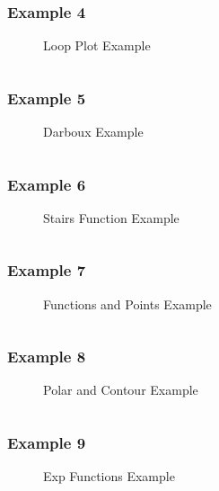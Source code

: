 \subsubsection{Example 4}
\begin{figure}[!htb]
    \centering
    
    \caption{Loop Plot Example}
    \label{fig:4-loop-to-plot-function}
\end{figure}
\inputminted{latex}{./gallery/example_4.tex}
\newpage

\subsubsection{Example 5}
\begin{figure}[!htb]
    \centering
    
    \caption{Darboux Example}
    \label{fig:5-darboux-function}
\end{figure}
\inputminted{latex}{./gallery/example_5.tex}
\newpage


\subsubsection{Example 6}
\begin{figure}[!htb]
    \centering
    
    \caption{Stairs Function Example}
    \label{fig:6-stairs-function}
\end{figure}
\inputminted{latex}{./gallery/example_6.tex}
\newpage


\subsubsection{Example 7}
\begin{figure}[!htb]
    \centering
    
    \caption{Functions and Points Example}
    \label{fig:7-points-function}
\end{figure}
\inputminted{latex}{./gallery/example_7.tex}
\newpage


\subsubsection{Example 8}
\begin{figure}[!htb]
    \centering
    
    \caption{Polar and Contour Example}
    \label{fig:polar-contour-plot}
\end{figure}
\inputminted{latex}{./gallery/example_8.tex}
\newpage


\subsubsection{Example 9}
\begin{figure}[!htb]
    \centering
    
    \caption{Exp Functions Example}
    \label{fig:9-exp-functions}
\end{figure}
\inputminted{latex}{./gallery/example_9.tex}
\newpage



